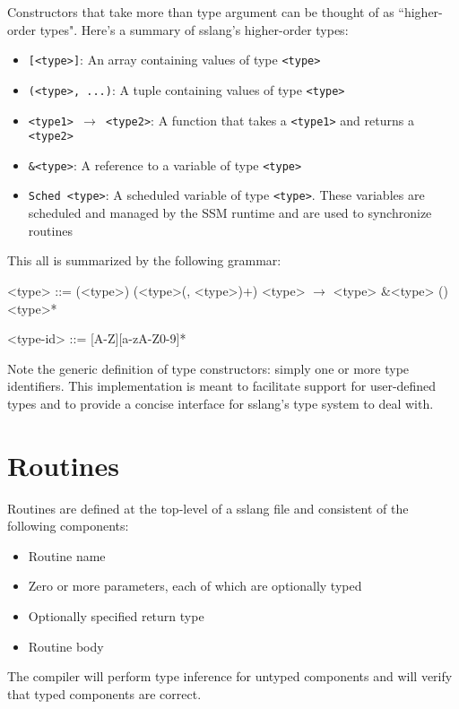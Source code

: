 \documentclass{article}
\begin{document}
\noindent Constructors that take more than type argument can be thought of as ``higher-order types". Here's a summary of sslang's higher-order types:
\begin{itemize}
    \item \texttt{[<type>]}: An array containing values of type \texttt{<type>}
    \item \texttt{(<type>, ...)}: A tuple containing values of type \texttt{<type>}
    \item \texttt{<type1> $\rightarrow$ <type2>}: A function that takes a   \texttt{<type1>} and returns a  \texttt{<type2>}
    \item \texttt{\&<type>}: A reference to a variable of type \texttt{<type>}
    \item \texttt{Sched <type>}: A scheduled variable of type \texttt{<type>}. These variables are scheduled and managed by the SSM runtime and are used to synchronize routines
\end{itemize}

\noindent This all is summarized by the following grammar:
\setlength{\grammarindent}{5em}
\begin{grammar}
<type> ::= (<type>)
\alt [<type>]
\alt (<type>(, <type>)+)
\alt <type> $\rightarrow$ <type>
\alt \&<type>
\alt ()
 <type>*

<type-id> ::= [A-Z][a-zA-Z0-9]* 
\end{grammar}

\noindent Note the generic definition of type constructors: simply one or more type identifiers. This implementation is meant to facilitate support for user-defined types and to provide a concise interface for sslang's type system to deal with.
\section{Routines}
\noindent Routines are defined at the top-level of a sslang file and consistent of the following components:
\begin{itemize}
    \item Routine name
    \item Zero or more parameters, each of which are optionally typed
    \item Optionally specified return type
    \item Routine body
\end{itemize}
\noindent The compiler will perform type inference for untyped components and will verify that typed components are correct.
\end{document}
